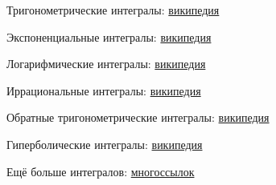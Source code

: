 \documentclass[main]{subfiles}
\begin{document}
    Тригонометрические интегралы: \href{https://ru.wikipedia.org/wiki/%D0%A1%D0%BF%D0%B8%D1%81%D0%BE%D0%BA_%D0%B8%D0%BD%D1%82%D0%B5%D0%B3%D1%80%D0%B0%D0%BB%D0%BE%D0%B2_%D0%BE%D1%82_%D1%82%D1%80%D0%B8%D0%B3%D0%BE%D0%BD%D0%BE%D0%BC%D0%B5%D1%82%D1%80%D0%B8%D1%87%D0%B5%D1%81%D0%BA%D0%B8%D1%85_%D1%84%D1%83%D0%BD%D0%BA%D1%86%D0%B8%D0%B9#%D0%98%D0%BD%D1%82%D0%B5%D0%B3%D1%80%D0%B0%D0%BB%D1%8B%2C_%D1%81%D0%BE%D0%B4%D0%B5%D1%80%D0%B6%D0%B0%D1%89%D0%B8%D0%B5_%D1%82%D0%BE%D0%BB%D1%8C%D0%BA%D0%BE_%D0%BA%D0%BE%D1%81%D0%B8%D0%BD%D1%83%D1%81}{википедия}

    Экспоненциальные интегралы: \href{https://ru.wikipedia.org/wiki/%D0%A1%D0%BF%D0%B8%D1%81%D0%BE%D0%BA_%D0%B8%D0%BD%D1%82%D0%B5%D0%B3%D1%80%D0%B0%D0%BB%D0%BE%D0%B2_%D0%BE%D1%82_%D1%8D%D0%BA%D1%81%D0%BF%D0%BE%D0%BD%D0%B5%D0%BD%D1%86%D0%B8%D0%B0%D0%BB%D1%8C%D0%BD%D1%8B%D1%85_%D1%84%D1%83%D0%BD%D0%BA%D1%86%D0%B8%D0%B9}{википедия}

    Логарифмические интегралы: \href{https://ru.wikipedia.org/wiki/%D0%A1%D0%BF%D0%B8%D1%81%D0%BE%D0%BA_%D0%B8%D0%BD%D1%82%D0%B5%D0%B3%D1%80%D0%B0%D0%BB%D0%BE%D0%B2_%D0%BE%D1%82_%D0%BB%D0%BE%D0%B3%D0%B0%D1%80%D0%B8%D1%84%D0%BC%D0%B8%D1%87%D0%B5%D1%81%D0%BA%D0%B8%D1%85_%D1%84%D1%83%D0%BD%D0%BA%D1%86%D0%B8%D0%B9}{википедия}

    Иррациональные интегралы: \href{https://ru.wikipedia.org/wiki/%D0%A1%D0%BF%D0%B8%D1%81%D0%BE%D0%BA_%D0%B8%D0%BD%D1%82%D0%B5%D0%B3%D1%80%D0%B0%D0%BB%D0%BE%D0%B2_%D0%BE%D1%82_%D0%B8%D1%80%D1%80%D0%B0%D1%86%D0%B8%D0%BE%D0%BD%D0%B0%D0%BB%D1%8C%D0%BD%D1%8B%D1%85_%D1%84%D1%83%D0%BD%D0%BA%D1%86%D0%B8%D0%B9}{википедия}

    Обратные тригонометрические интегралы: \href{https://ru.wikipedia.org/wiki/%D0%A1%D0%BF%D0%B8%D1%81%D0%BE%D0%BA_%D0%B8%D0%BD%D1%82%D0%B5%D0%B3%D1%80%D0%B0%D0%BB%D0%BE%D0%B2_%D0%BE%D1%82_%D0%BE%D0%B1%D1%80%D0%B0%D1%82%D0%BD%D1%8B%D1%85_%D1%82%D1%80%D0%B8%D0%B3%D0%BE%D0%BD%D0%BE%D0%BC%D0%B5%D1%82%D1%80%D0%B8%D1%87%D0%B5%D1%81%D0%BA%D0%B8%D1%85_%D1%84%D1%83%D0%BD%D0%BA%D1%86%D0%B8%D0%B9}{википедия}

    Гиперболические интегралы: \href{https://ru.wikipedia.org/wiki/%D0%A1%D0%BF%D0%B8%D1%81%D0%BE%D0%BA_%D0%B8%D0%BD%D1%82%D0%B5%D0%B3%D1%80%D0%B0%D0%BB%D0%BE%D0%B2_%D0%BE%D1%82_%D0%B3%D0%B8%D0%BF%D0%B5%D1%80%D0%B1%D0%BE%D0%BB%D0%B8%D1%87%D0%B5%D1%81%D0%BA%D0%B8%D1%85_%D1%84%D1%83%D0%BD%D0%BA%D1%86%D0%B8%D0%B9}{википедия}

    Ещё больше интегралов: \href{http://eqworld.ipmnet.ru/ru/auxiliary/aux-integrals.htm}{многоссылок}
\end{document}
